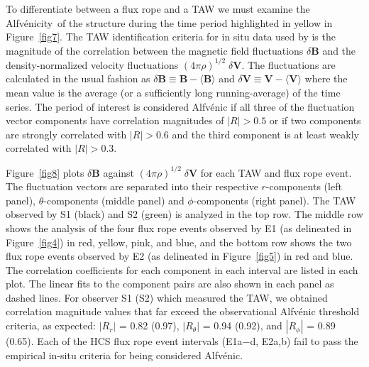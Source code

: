 \documentclass[preprint]{aastex62}
\newcommand{\Alfvenicity}{Alfv\'{e}nicity\ }
\begin{document}
To differentiate between a flux rope and a TAW we must examine the
\Alfvenicity of the structure during the time period highlighted in yellow in Figure~\ref{fig7}. The TAW identification criteria for in situ data used by \citet{Yu2014,Yu2016} is the magnitude of the correlation between the magnetic field fluctuations $\delta \boldsymbol{B}$ and the density-normalized velocity fluctuations $(4\pi\rho)^{1/2} \; \delta\boldsymbol{V}$. The fluctuations are calculated in the usual fashion as $\delta \boldsymbol{B} \equiv \boldsymbol{B}-\langle \boldsymbol{B} \rangle$ and $\delta \boldsymbol{V} \equiv \boldsymbol{V}-\langle \boldsymbol{V} \rangle$ where the mean value is the average (or a sufficiently long running-average) of the time series. The period of interest is considered Alfv\'{e}nic if all three of the fluctuation vector components have correlation magnitudes of $|R| > 0.5$ or if two components are strongly correlated with $|R| >0.6$ and the third component is at least weakly correlated with $|R| > 0.3$.  

Figure~\ref{fig8} plots $\delta \boldsymbol{B}$ against $(4\pi\rho)^{1/2} \; \delta
\boldsymbol{V}$ for each TAW and flux rope event. The fluctuation vectors are separated into their respective $r$-components (left panel), $\theta$-components (middle panel) and $\phi$-components (right panel). The TAW observed by S1 (black) and S2 (green) is analyzed in the top row. The middle row shows the analysis of the four flux rope events observed by E1 (as delineated in Figure~\ref{fig4}) in red, yellow, pink, and blue, and the bottom row shows the two flux rope events observed by E2 (as delineated in Figure~\ref{fig5}) in red and blue. The correlation coefficients for each component in each interval are listed in each plot. The linear fits to the component pairs are also shown in each panel as dashed lines. For observer S1 (S2) which measured the TAW, we obtained correlation magnitude values that far exceed the observational Alfv\'{e}nic threshold criteria, as expected: {$|R_r|$ = 0.82 (0.97), $|R_\theta|$ = 0.94 (0.92), and $|R_\phi|$ = 0.89 (0.65)}.  Each of the HCS flux rope {event intervals (E1a$-$d, E2a,b) fail to pass the empirical in-situ} criteria for being considered Alfv\'{e}nic.
\end{document}
